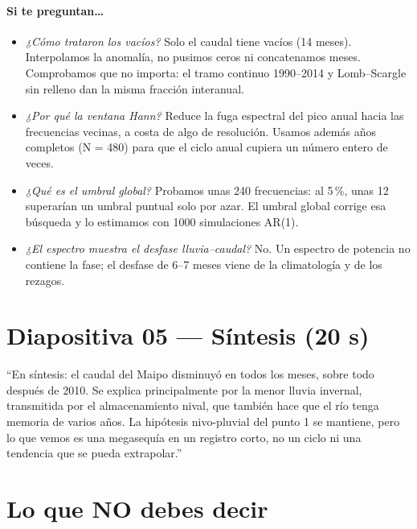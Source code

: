 \documentclass[11pt,letterpaper]{article}
\begin{document}
\paragraph{Si te preguntan\ldots}
\begin{itemize}
\item \emph{¿Cómo trataron los vacíos?} Solo el caudal tiene vacíos (14 meses). Interpolamos la anomalía, no
pusimos ceros ni concatenamos meses. Comprobamos que no importa: el tramo continuo 1990--2014 y Lomb--Scargle
sin relleno dan la misma fracción interanual.
\item \emph{¿Por qué la ventana Hann?} Reduce la fuga espectral del pico anual hacia las frecuencias vecinas, a
costa de algo de resolución. Usamos además años completos (N = 480) para que el ciclo anual cupiera un número
entero de veces.
\item \emph{¿Qué es el umbral global?} Probamos unas 240 frecuencias: al 5\,\%, unas 12 superarían un umbral
puntual solo por azar. El umbral global corrige esa búsqueda y lo estimamos con 1000 simulaciones AR(1).
\item \emph{¿El espectro muestra el desfase lluvia--caudal?} No. Un espectro de potencia no contiene la fase;
el desfase de 6--7 meses viene de la climatología y de los rezagos.
\end{itemize}

\section{Diapositiva 05 --- Síntesis (20 s)}

\begin{guion}
``En síntesis: el caudal del Maipo disminuyó en todos los meses, sobre todo después de 2010. Se explica
principalmente por la menor lluvia invernal, transmitida por el almacenamiento nival, que también hace que el
río tenga memoria de varios años. La hipótesis nivo-pluvial del punto 1 se mantiene, pero lo que vemos es una
megasequía en un registro corto, no un ciclo ni una tendencia que se pueda extrapolar.''
\end{guion}

\section{Lo que NO debes decir}
\end{document}
